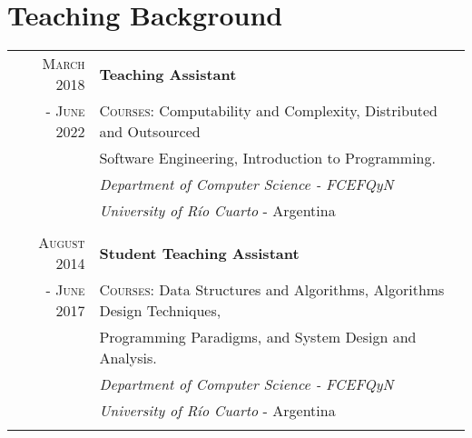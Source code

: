 \documentclass[a4paper,10pt]{article} %
\begin{document}
\section{Teaching Background}
\begin{longtable}{rl}

\textsc{March 2018} & \textbf{Teaching Assistant} \\
\textsc{- June 2022} & \textsc{Courses:} Computability and Complexity, Distributed and Outsourced \\
& Software Engineering, Introduction to Programming. \\
& \textit{Department of Computer Science - FCEFQyN} \\
& \textit{University of Río Cuarto} - Argentina \\ & \\

\textsc{August 2014} & \textbf{Student Teaching Assistant} \\
\textsc{- June 2017} & \textsc{Courses:} Data Structures and Algorithms, Algorithms Design Techniques, \\
& Programming Paradigms, and System Design and Analysis. \\
& \textit{Department of Computer Science - FCEFQyN} \\
& \textit{University of Río Cuarto} - Argentina \\ & \\

\end{longtable}
\end{document}
